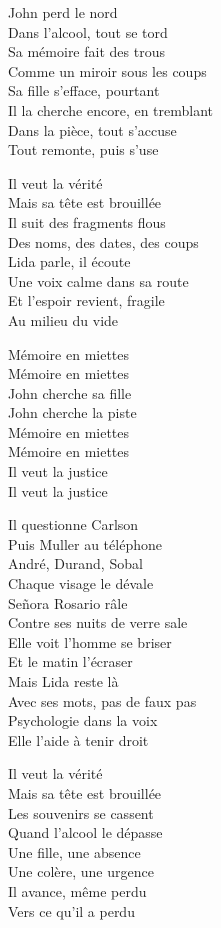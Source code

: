 \begin{lyrics}
John perd le nord\\
Dans l’alcool, tout se tord\\
Sa mémoire fait des trous\\
Comme un miroir sous les coups\\
Sa fille s’efface, pourtant\\
Il la cherche encore, en tremblant\\
Dans la pièce, tout s’accuse\\
Tout remonte, puis s’use

Il veut la vérité\\
Mais sa tête est brouillée\\
Il suit des fragments flous\\
Des noms, des dates, des coups\\
Lida parle, il écoute\\
Une voix calme dans sa route\\
Et l’espoir revient, fragile\\
Au milieu du vide

Mémoire en miettes\\
Mémoire en miettes\\
John cherche sa fille\\
John cherche la piste\\
Mémoire en miettes\\
Mémoire en miettes\\
Il veut la justice\\
Il veut la justice

Il questionne Carlson\\
Puis Muller au téléphone\\
André, Durand, Sobal\\
Chaque visage le dévale\\
Señora Rosario râle\\
Contre ses nuits de verre sale\\
Elle voit l’homme se briser\\
Et le matin l’écraser\\
Mais Lida reste là\\
Avec ses mots, pas de faux pas\\
Psychologie dans la voix\\
Elle l’aide à tenir droit

Il veut la vérité\\
Mais sa tête est brouillée\\
Les souvenirs se cassent\\
Quand l’alcool le dépasse\\
Une fille, une absence\\
Une colère, une urgence\\
Il avance, même perdu\\
Vers ce qu’il a perdu


\end{lyrics}
